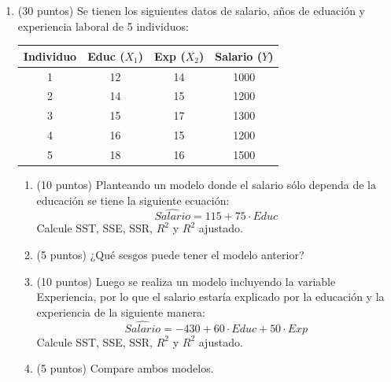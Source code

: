 \documentclass[10pt,a4paper]{article}
\begin{document}
\begin{enumerate}
Se plantea un modelo donde el Puntaje esta dado por:
$$Puntaje = \beta_0 + \beta_1 CI + u$$

\begin{enumerate}
    \item (5 puntos) Explique por qué en este modelo es importante suponer que $E(u|X)=0$. ¿Qué pasaría si este supuesto no se cumple?

    \item (15 puntos) Calcule los estimadores del modelo, $\hat{\beta_0}$ y $\hat{\beta_1}$, que describen el comportamiento del Puntaje en función del CI.

    \item (5 puntos) ¿Qué representan los valores de $\hat{\beta_0}$ y $\hat{\beta_1}$?
\end{enumerate}

\item (30 puntos) Se tienen los siguientes datos de salario, años de eduación y experiencia laboral de 5 individuos:
\begin{center}
\begin{tabular}{|c|c|c|c|}
\hline
\textbf{Individuo} & \textbf{Educ} ($X_1$) & \textbf{Exp} ($X_2$)  & \textbf{Salario ($Y$)}\\
\hline
1 & 12 & 14 & 1000 \\
2 & 14 & 15 & 1200 \\
3 & 15 & 17 & 1300 \\
4 & 16 & 15 & 1200 \\
5 & 18 & 16 & 1500 \\
\hline
\end{tabular}
\end{center}

\begin{enumerate}
    \item (10 puntos) Planteando un modelo donde el salario sólo dependa de la educación se tiene la siguiente ecuación:
    $$\widehat{Salario} = 115 + 75 \cdot Educ$$
    Calcule SST, SSE, SSR, $R^2$ y $R^2$ ajustado.

    \item (5 puntos) ¿Qué sesgos puede tener el modelo anterior?

    \item (10 puntos) Luego se realiza un modelo incluyendo la variable Experiencia, por lo que el salario estaría explicado por la educación y la experiencia de la siguiente manera:
    $$\widehat{Salario} = -430 + 60 \cdot Educ + 50 \cdot Exp$$
    Calcule SST, SSE, SSR, $R^2$ y $R^2$ ajustado.

    \item (5 puntos) Compare ambos modelos. 
\end{enumerate}

\end{enumerate}
\end{document}
